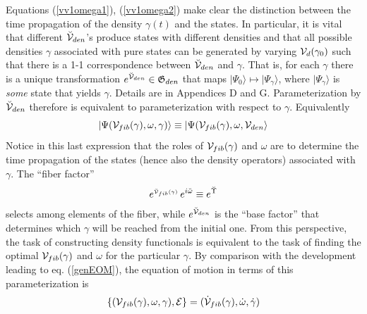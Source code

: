 Equations (\ref{vv1omega1}), (\ref{vv1omega2}) make clear the distinction
between the time propagation of the density $\gamma (t)$ and the states. In
particular, it is vital that different $\breve{{\cal V}}_{den}$'s produce
states with different densities and that all possible densities $\gamma $
associated with pure states can be generated by varying ${\cal V}_{d}(\gamma
_{0})$ such that there is a 1-1 correspondence between $\breve{{\cal V}}%
_{den}$ and $\gamma $. That is, for each $\gamma $ there is a unique
transformation $e^{\breve{{\cal V}}_{den}}\in {\frak G}_{den}$ that maps $%
|\Psi _{0}\rangle \mapsto |\Psi _{\gamma }\rangle $, where $|\Psi _{\gamma
}\rangle $ is {\em some} state that yields $\gamma $. Details are in
Appendices D and G. Parameterization by $\breve{{\cal V}}_{den}$ therefore
is equivalent to parameterization with respect to $\gamma $. Equivalently 
\begin{equation}
|\Psi ({\cal V}_{fib}(\gamma ),\omega ,\gamma )\rangle \equiv |\Psi ({\cal V}%
_{fib}(\gamma ),\omega ,{\cal V}_{den}\rangle
\end{equation}%
Notice in this last expression that the roles of ${\cal V}_{fib}(\gamma )$
and $\omega $ are to determine the time propagation of the states (hence
also the density operators) associated with $\gamma $. The ``fiber factor'' 
\begin{equation}
e^{_{{\cal \breve{V}}_{fib}(\gamma )}}\,e^{i\breve{\omega}}\equiv e^{\breve{%
\Upsilon}}  \label{fiberfactor}
\end{equation}%
selects among elements of the fiber, while $e^{\breve{{\cal V}}_{den}}$ is
the ``base factor'' that determines which $\gamma $ will be reached from the
initial one. From this perspective, the task of constructing density
functionals is equivalent to the task of finding the optimal ${\cal V}%
_{fib}(\gamma )$ and $\omega $ for the particular $\gamma $. By comparison
with the development leading to eq. (\ref{genEOM}), the equation of motion
in terms of this parameterization is 
\begin{equation}
\{({\cal V}_{fib}(\gamma ),\omega ,\gamma ),{\cal E}\}=({\cal \dot{V}}%
_{fib}(\gamma ),\dot{\omega},\dot{\gamma})  \label{Vomegagammaeom}
\end{equation}

